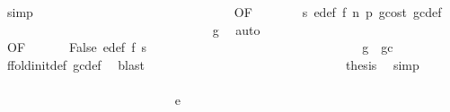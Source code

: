 \begin{isabellebody}
\ simp\isanewline
\ \ \ \ \ \ \ \ \ \ \ \ \ \ \ \ \ \ \ \ \ \ \ \ \ \ \ \ \isamarkupfalse%
\ \isamarkupfalse%
\ {}{}{\isacharparenleft}{\kern0pt}{}{\isacharparenright}{\kern0pt}{\isacharbrackleft}{\kern0pt}OF\ {\isacharasterisk}{\kern0pt}\ {\isacharasterisk}{\kern0pt}{\isacharasterisk}{\kern0pt}\ {}\ {\isacharunderscore}{\kern0pt}\ {}\ {\isacharunderscore}{\kern0pt}\ {\isacharunderscore}{\kern0pt}\ s{}{\isacharbrackright}{\kern0pt}\ e{\isacharprime}{\kern0pt}{\isacharunderscore}{\kern0pt}def\ f{}\ n{}\ p{}\ gcost\ gc{\isacharunderscore}{\kern0pt}def\isanewline
\ \ \ \ \ \ \ \ \ \ \ \ \ \ \ \ \ \ \ \ \ \ \ \ \ \ \ \ \ \ \isamarkupfalse%
\ {\isachardoublequoteopen}{\isasymdots}\ {\isasymle}\ g{\isacharprime}{\kern0pt}{\isachardoublequoteclose}\ \isamarkupfalse%
\ auto\isanewline
\ \ \ \ \ \ \ \ \ \ \ \ \ \ \ \ \ \ \ \ \ \ \ \ \ \ \ \ \isamarkupfalse%
\ \isamarkupfalse%
\ {}{}{\isacharparenleft}{\kern0pt}{}{\isacharparenright}{\kern0pt}{\isacharbrackleft}{\kern0pt}OF\ {\isacharasterisk}{\kern0pt}\ {\isacharasterisk}{\kern0pt}{\isacharasterisk}{\kern0pt}\ {}\ {\isacharunderscore}{\kern0pt}\ {}\ {\isacharunderscore}{\kern0pt}{\isacharbrackright}{\kern0pt}\ False\ e{\isacharprime}{\kern0pt}{\isacharunderscore}{\kern0pt}def\ f{}\ s{}\isanewline
\ \ \ \ \ \ \ \ \ \ \ \ \ \ \ \ \ \ \ \ \ \ \ \ \ \ \ \ \ \ \isamarkupfalse%
\ {\isachardoublequoteopen}{\isasymdots}\ {\isasymle}\ g\ {\isacharminus}{\kern0pt}\ gc{\isachardoublequoteclose}\ \isamarkupfalse%
\ ffold{\isacharunderscore}{\kern0pt}init{\isacharunderscore}{\kern0pt}def\ gc{\isacharunderscore}{\kern0pt}def\ \isamarkupfalse%
\ blast\isanewline
\ \ \ \ \ \ \ \ \ \ \ \ \ \ \ \ \ \ \ \ \ \ \ \ \ \ \ \ \isamarkupfalse%
\ \isamarkupfalse%
\ {\isacharquery}{\kern0pt}thesis\ \isamarkupfalse%
\ simp\isanewline
\ \ \ \ \ \ \ \ \ \ \ \ \ \ \ \ \ \ \ \ \ \ \ \ \ \ \isamarkupfalse%
\isanewline
\ \ \ \ \ \ \ \ \ \ \ \ \ \ \ \ \ \ \ \ \ \ \ \ \isamarkupfalse%
\isanewline
\ \ \ \ \ \ \ \ \ \ \ \ \ \ \ \ \ \ \ \ \ \ \ \ \ \ \isamarkupfalse%
\ {\isacharparenleft}{\kern0pt}e\ {\isacharunderscore}{\kern0pt}{\isacharparenright}{\kern0pt}\isanewline
\ \ \ \ \ \ \ \ \ \ \ \ \ \ \ \ \ \ \ \ \ \ \ \ \ \ \isamarkupfalse%

\end{isabellebody}
